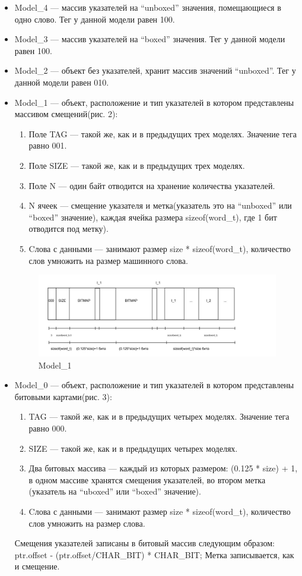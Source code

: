 \begin{itemize}
\item Model\_4 — массив указателей на ``unboxed'' значения, помещающиеся в одно слово.
Тег у данной модели равен 100.
\item Model\_3 — массив указателей на ``boxed'' значения.
Тег у данной модели равен 100.

\item Model\_2 — объект без указателей, хранит массив значений ``unboxed''.
Тег у данной модели равен 010.

\item Model\_1 — объект, расположение и тип указателей в котором представлены массивом смещений(рис. 2):
\begin{enumerate}
\item Поле TAG — такой же, как и в предыдущих трех моделях. Значение тега равно 001.
\item Поле SIZE — такой же, как и в предыдущих трех моделях.
\item Поле N — один байт отводится на хранение количества указателей.
\item N ячеек — смещение указателя и метка(указатель это на ``unboxed'' или ``boxed''  значение), каждая ячейка размера sizeof(word\_t), где 1 бит отводится под метку). 
\item Cлова с данными — занимают размер  size * sizeof(word\_t), количество слов умножить на размер машинного слова.
\end{enumerate}

\begin{figure}[h]
\includegraphics[width=1\textwidth]{Kren/2}
\caption{Model\_1}
\end{figure}

\item Model\_0 — объект, расположение и тип указателей в котором представлены битовыми картами(рис. 3):
\begin{enumerate}
\item TAG — такой же, как и в предыдущих четырех моделях. Значение тега равно 000.
\item SIZE — такой же, как и в предыдущих четырех моделях.
\item Два битовых массива —  каждый из которых размером: (0.125 * size) + 1, в одном массиве хранятся смещения указателей, во втором метка (указатель на ``uboxed'' или ``boxed''  значение).
\item Cлова с данными — занимают размер size * sizeof(word\_t), количество слов умножить на размер слова.
\end{enumerate}
Смещения указателей записаны в битовый массив следующим образом: ptr.offset - (ptr.offset/CHAR\_BIT) * CHAR\_BIT;
Метка записывается, как и смещение.
\end{itemize}
